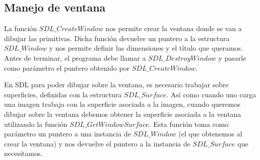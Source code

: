 \documentclass[a4paper]{article}
\begin{document}
\subsection{Manejo de ventana}
La función $SDL\_CreateWindow$ nos permite crear la ventana donde se van a dibujar las primitivas. Dicha función devuelve un puntero a la estructura $SDL\_Window$ y nos permite definir las dimensiones y el título que queramos. Antes de terminar, el programa debe llamar a $SDL\_DestroyWindow$ y pasarle como parámetro el puntero obtenido por $SDL\_CreateWindow$.
\par En SDL para poder dibujar sobre la ventana, es necesario trabajar sobre superficies, definidas con la estructura $SDL\_Surface$. Así como cuando uno carga una imagen trabaja con la superficie asociada a la imagen, cuando queremos dibujar sobre la ventana debemos obtener la superficie asociada a la ventana utilizando la función $SDL\_GetWindowSurface$. Esta función toma como parámetro un puntero a una instancia de $SDL\_Window$ (el que obtenemos al crear la ventana) y nos devuelve el puntero a la instancia de $SDL\_Surface$ que necesitamos.
\end{document}
